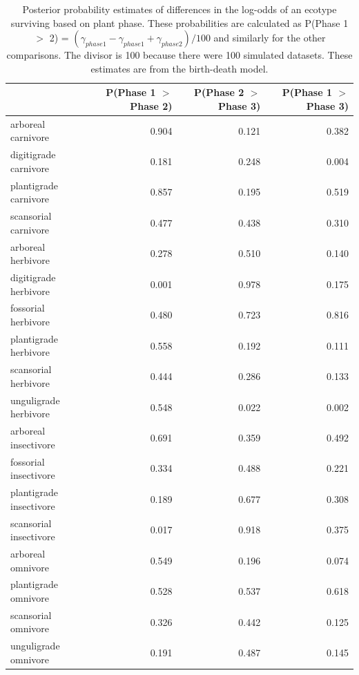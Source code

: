 \documentclass[12pt,letterpaper]{article}
\begin{document}
\begin{table}[ht]
  \centering
  \caption[Posterior probablity estimates of differences in survival by plant phase]{Posterior probability estimates of differences in the log-odds of an ecotype surviving based on plant phase. These probabilities are calculated as P(Phase 1 \(>\) 2) = \( (\gamma_{phase 1} - \gamma_{phase 1} + \gamma_{phase 2}) / 100\) and similarly for the other comparisons. The divisor is 100 because there were 100 simulated datasets. These estimates are from the birth-death model.}
  \label{tab:surv_plant}
  \begin{tabular}{ l r r r }
    \hline
    & P(Phase 1 $>$ Phase 2) & P(Phase 2 $>$ Phase 3) & P(Phase 1 $>$ Phase 3) \\ 
    \hline
    arboreal carnivore & 0.904 & 0.121 & 0.382 \\ 
    digitigrade carnivore & 0.181 & 0.248 & 0.004 \\ 
    plantigrade carnivore & 0.857 & 0.195 & 0.519 \\ 
    scansorial carnivore & 0.477 & 0.438 & 0.310 \\ 
    arboreal herbivore & 0.278 & 0.510 & 0.140 \\ 
    digitigrade herbivore & 0.001 & 0.978 & 0.175 \\ 
    fossorial herbivore & 0.480 & 0.723 & 0.816 \\ 
    plantigrade herbivore & 0.558 & 0.192 & 0.111 \\ 
    scansorial herbivore & 0.444 & 0.286 & 0.133 \\ 
    unguligrade herbivore & 0.548 & 0.022 & 0.002 \\ 
    arboreal insectivore & 0.691 & 0.359 & 0.492 \\ 
    fossorial insectivore & 0.334 & 0.488 & 0.221 \\ 
    plantigrade insectivore & 0.189 & 0.677 & 0.308 \\ 
    scansorial insectivore & 0.017 & 0.918 & 0.375 \\ 
    arboreal omnivore & 0.549 & 0.196 & 0.074 \\ 
    plantigrade omnivore & 0.528 & 0.537 & 0.618 \\ 
    scansorial omnivore & 0.326 & 0.442 & 0.125 \\ 
    unguligrade omnivore & 0.191 & 0.487 & 0.145 \\ 
    \hline
  \end{tabular}
\end{table}
\end{document}
